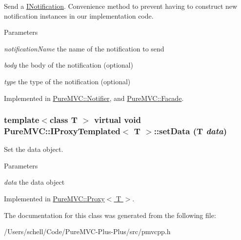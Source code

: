 Send a {\ttfamily \hyperlink{class_pure_m_v_c_1_1_i_notification}{INotification}}. Convenience method to prevent having to construct new notification instances in our implementation code.


\begin{DoxyParams}{Parameters}
\item[{\em notificationName}]the name of the notification to send \item[{\em body}]the body of the notification (optional) \item[{\em type}]the type of the notification (optional) \end{DoxyParams}


Implemented in \hyperlink{class_pure_m_v_c_1_1_notifier_a55a358ee2661ecc08400653016fdb497}{PureMVC::Notifier}, and \hyperlink{class_pure_m_v_c_1_1_facade_a39a61e0a65d0f979848d36fe99cfd5f5}{PureMVC::Facade}.\hypertarget{class_pure_m_v_c_1_1_i_proxy_templated_aef201c3df1efc6c2652f5de3ba0fff74}{
\subsubsection[{setData}]{\setlength{\rightskip}{0pt plus 5cm}template$<$class T $>$ virtual void {\bf PureMVC::IProxyTemplated}$<$ T $>$::setData (T {\em data})}}
\label{class_pure_m_v_c_1_1_i_proxy_templated_aef201c3df1efc6c2652f5de3ba0fff74}


Set the data object. 
\begin{DoxyParams}{Parameters}
\item[{\em data}]the data object \end{DoxyParams}


Implemented in \hyperlink{class_pure_m_v_c_1_1_proxy_ae14f7e555987a8e25584067a0e96c32a}{PureMVC::Proxy$<$ T $>$}.

The documentation for this class was generated from the following file:\begin{DoxyCompactItemize}
\item 
/Users/schell/Code/PureMVC-\/Plus-\/Plus/src/pmvcpp.h\end{DoxyCompactItemize}
